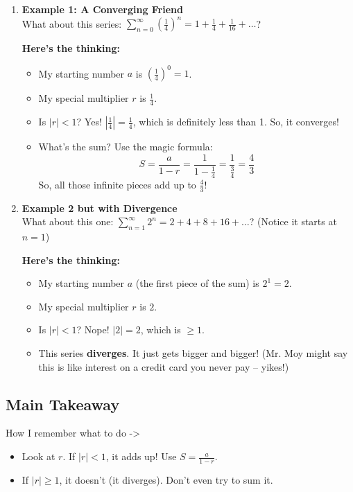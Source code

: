 \documentclass{article}
\begin{document}
\begin{enumerate}[label=\textbf{\arabic*.},itemsep=15pt]

  \item \textbf{Example 1: A Converging Friend} \\
        What about this series: \(\displaystyle\sum_{n=0}^{\infty}\left(\frac{1}{4}\right)^n = 1 + \frac{1}{4} + \frac{1}{16} + \dots\)?

        \textbf{Here's the thinking:}
        \begin{itemize}
            \item My starting number \(a\) is \((\frac{1}{4})^0 = 1\).
            \item My special multiplier \(r\) is \(\frac{1}{4}\).
            \item Is \(|r| < 1\)? Yes! \(|\frac{1}{4}| = \frac{1}{4}\), which is definitely less than 1. So, it converges!
            \item What's the sum? Use the magic formula:
                  \[ S = \frac{a}{1-r} = \frac{1}{1-\frac{1}{4}} = \frac{1}{\frac{3}{4}} = \frac{4}{3} \]
            So, all those infinite pieces add up to \(\frac{4}{3}\)!
        \end{itemize}
        
        \vspace{10pt}

  \item \textbf{Example 2 but with Divergence} \\
        What about this one: \(\displaystyle\sum_{n=1}^{\infty} 2^n = 2 + 4 + 8 + 16 + \dots\)? (Notice it starts at $n=1$)

        \textbf{Here's the thinking:}
        \begin{itemize}
            \item My starting number \(a\) (the first piece of the sum) is \(2^1 = 2\).
            \item My special multiplier \(r\) is \(2\).
            \item Is \(|r| < 1\)? Nope! \(|2| = 2\), which is \(\ge 1\).
            \item This series \textbf{diverges}. It just gets bigger and bigger! (Mr. Moy might say this is like interest on a credit card you never pay – yikes!)
        \end{itemize}
\end{enumerate}


\subsection*{Main Takeaway}
How I remember what to do ->
\begin{itemize}
    \item Look at \(r\). If \(|r|<1\), it adds up! Use \(S = \frac{a}{1-r}\).
    \item If \(|r| \ge 1\), it doesn't (it diverges). Don't even try to sum it.
\end{itemize}
\end{document}
